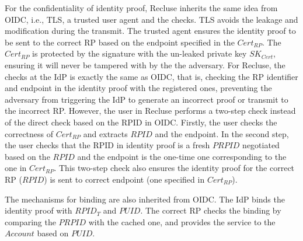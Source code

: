 For the confidentiality of identity proof, Recluse inherits the same idea from OIDC, i.e., TLS, a trusted user agent and the checks. TLS avoids the leakage and modification during the transmit. The trusted agent ensures the identity proof to be sent to the correct RP based on the endpoint specified in the $Cert_{RP}$. The  $Cert_{RP}$ is protected by the signature with the un-leaked private key $SK_{Cert}$, ensuring it  will never be tampered with by the the adversary. For Recluse, the checks at the IdP is exactly the same as OIDC, that is, checking the RP identifier and endpoint in the identity proof with the registered ones, preventing the adversary from triggering the IdP to
generate an incorrect proof or transmit to the incorrect RP. However, the user in Recluse performs a two-step check instead of the direct check based on the RPID in OIDC. Firstly, the user checks the correctness of $Cert_{RP}$ and extracts  $RPID$ and the endpoint. In the second step, the user checks that the RPID in identity proof is a fresh $PRPID$ negotiated based on the $RPID$ and the endpoint is the one-time one corresponding to the one in $Cert_{RP}$. This two-step check also ensures the identity proof for the correct RP ($RPID$) is sent to correct endpoint (one specified in $Cert_{RP}$).

The mechanisms for binding are also inherited from OIDC. The IdP binds the identity proof with $RPID_{T}$ and $PUID$. The correct RP checks the binding by comparing the $PRPID$ with the cached one, and provides the service  to the $Account$ based on $PUID$.


